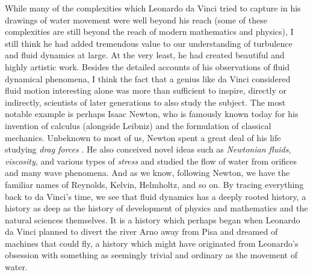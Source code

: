 \documentclass[12pt]{article}
\begin{document}
While many of the complexities which Leonardo da Vinci tried to capture in his drawings of water movement were well beyond his reach (some of these complexities are still beyond the reach of modern mathematics and physics), I still think he had added tremendous value to our understanding of turbulence and fluid dynamics at large. At the very least, he had created beautiful and highly artistic work. Besides the detailed accounts of his observations of fluid dynamical phenomena, I think the fact that a genius like da Vinci considered fluid motion interesting alone was more than sufficient to inspire, directly or indirectly, scientists of later generations to also study the subject. The most notable example is perhaps Isaac Newton, who is famously known today for his invention of calculus (alongside Leibniz) and the formulation of classical mechanics. Unbeknown to most of us, Newton spent a great deal of his life studying \textit{drag forces} \cite{smith1998newton}.  He also conceived novel ideas such as \textit{Newtonian fluids}, \textit{viscosity}, and various types of \textit{stress} and studied the flow of water from orifices and many wave phenomena. And as we know, following Newton, we have the familiar names of Reynolds, Kelvin, Helmholtz, and so on. By tracing everything back to da Vinci's time, we see that fluid dynamics has a deeply rooted history, a history as deep as the history of development of physics and mathematics and the natural sciences themselves. It is a history which perhaps began when Leonardo da Vinci planned to divert the river Arno away from Pisa and dreamed of machines that could fly, a history which might have originated from Leonardo's obsession with something as seemingly trivial and ordinary as the movement of water.







\end{document}
